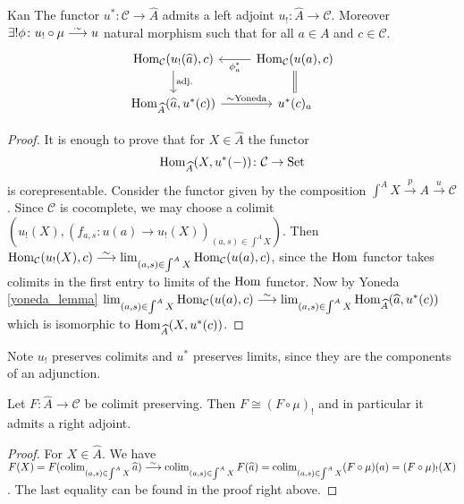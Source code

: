 \begin{thm}{Kan}
\label{Kan_extending_by_colimits}
    The functor $u^*\colon \mathcal{C} \to \widehat{A}$ admits a left adjoint $u_!\colon \widehat{A} \to \mathcal{C}$.
    Moreover $\exists !\phi \colon u_! \circ \mu \isomorphism u$ natural morphism such that for all $a \in A$ and $c \in \mathcal{C}$.
    \[
    \begin{tikzcd}
        \Hom_{\mathcal{C}}(u_!(\widehat{a}),c)
        \ar[d,"\text{adj.}"]
        &
        \Hom_{\mathcal{C}}(u(a),c)
        \ar[l, "\phi_a^*"]
        \ar[d, equal]
        \\
        \Hom_{\widehat{A}}(\widehat{a},u^*(c)) 
        \ar[r, "\sim \text{Yoneda}"]
        &
        u^*(c)_a
    \end{tikzcd}
    \]
\end{thm}

\begin{proof}
    It is enough to prove that for $X \in \widehat{A}$ the functor
    \[
    \operatorname{Hom}_{\widehat{A}}(X,u^*(-))\colon \mathcal{C} \to \operatorname{Set}
    \]
    is corepresentable.
    Consider the functor given by the composition $ \int^A X \xrightarrow{p} A \xrightarrow{u} \mathcal{C}$.
    Since $\mathcal{C}$ is cocomplete, we may choose a colimit $(u_!(X), (f_{a,s}\colon u(a) \to u_!(X))_{(a,s) \in \int^A X})$.
    Then $\Hom_{\mathcal{C}}(u_!(X),c) \isomorphism \lim_{(a,s) \in \int^A X} \Hom_{\mathcal{C}}(u(a),c)$, since the $\operatorname{Hom}$ functor takes colimits in the first entry to limits of the $\operatorname{Hom}$ functor.
    Now by Yoneda \cref{yoneda_lemma} $\lim_{(a,s) \in \int^A X} \Hom_{\mathcal{C}}(u(a),c) \isomorphism \lim_{(a,s) \in \int^A X} \Hom_{\widehat{A}}(\widehat{a},u^*(c))$ which is isomorphic to $\operatorname{Hom}_{\widehat{A}}(X,u^*(c))$.
\end{proof}

\begin{rmk}
    Note $u_!$ preserves colimits and $u^*$ preserves limits, since they are the components of an adjunction.
\end{rmk}

\begin{prop}
\label{colimit_preserving_admits_right_adjoint}
    Let $F\colon \widehat{A} \to \mathcal{C}$ be colimit preserving. 
    Then $F \cong (F \circ \mu)_!$ and in particular it admits a right adjoint.
\end{prop}

\begin{proof}
    For $X \in \widehat{A}$. 
    We have $F(X)=F(\colim_{(a,s) \in \int^A X}\widehat{a}) \isomorphism \colim_{(a,s) \in \int^A X}F(\widehat{a}) = \colim_{(a,s) \in \int^A X} ( F \circ \mu ) ( a ) = ( F  \circ \mu )_! ( X ) $.
    The last equality can be found in the proof right above.
\end{proof}

